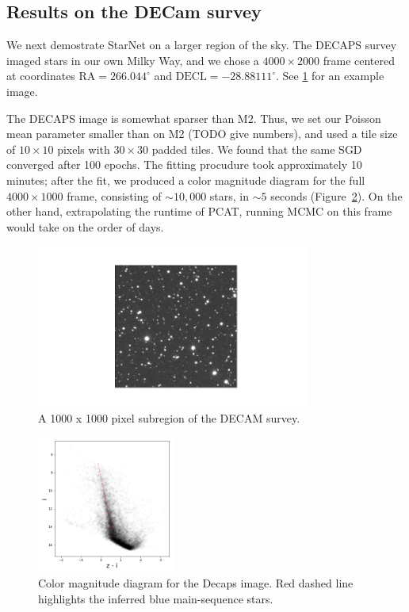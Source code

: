 \subsection{Results on the DECam survey}
\label{sec:results_on_decam}

We next demostrate StarNet on a larger region of the sky.
The DECAPS survey imaged stars in our own Milky Way, and we chose
a $4000 \times 2000$ frame centered at coordinates $\text{RA} = 266.044^\circ$ and
$\text{DECL} = -28.88111^\circ$. See \ref{fig:decaps_ex} for an example image.

The DECAPS image is somewhat sparser than M2.
Thus, we set our Poisson mean parameter
smaller than on M2 (TODO give numbers), and
used a tile size of $10\times 10$ pixels with $30\times30$
padded tiles. We found that the same SGD converged after
100 epochs.
The fitting procudure took approximately 10 minutes; after the fit,
we produced
a color magnitude diagram for the full $4000 \times 1000$ frame,
consisting of $\sim 10,000$ stars, in $\sim 5$ seconds (Figure~\ref{fig:decaps_cmd}).
On the other hand, extrapolating the runtime of PCAT, running MCMC on this frame
would take on the order of days.


\begin{figure}[tb]
    \centering
    \includegraphics[width=0.8\textwidth]{./figures/decaps/example_subimage1000_decaps.png}
    \vspace{-0.4cm}
    \caption{A 1000 x 1000 pixel subregion of the DECAM survey. }
    \label{fig:decaps_ex}
\end{figure}

\begin{figure}[tb]
    \centering
    \includegraphics[width=0.4\textwidth]{./figures/decaps/decaps_cmd.png}
    \vspace{-0.4cm}
    \caption{Color magnitude diagram for the Decaps image. Red dashed line highlights
    the inferred blue main-sequence stars.
    }
    \label{fig:decaps_cmd}
\end{figure}
